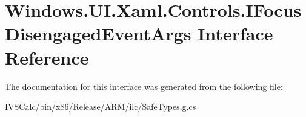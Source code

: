 \hypertarget{interface_windows_1_1_u_i_1_1_xaml_1_1_controls_1_1_i_focus_disengaged_event_args}{}\section{Windows.\+U\+I.\+Xaml.\+Controls.\+I\+Focus\+Disengaged\+Event\+Args Interface Reference}
\label{interface_windows_1_1_u_i_1_1_xaml_1_1_controls_1_1_i_focus_disengaged_event_args}


The documentation for this interface was generated from the following file\+:\begin{DoxyCompactItemize}
\item 
I\+V\+S\+Calc/bin/x86/\+Release/\+A\+R\+M/ilc/Safe\+Types.\+g.\+cs\end{DoxyCompactItemize}
